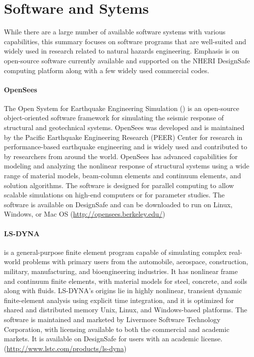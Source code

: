 \section{Software and Sytems}
\label{sec:resp_struct_tools}

While there are a large number of available software systems with various capabilities, this summary focuses on software programs that are well-suited and widely used in research related to natural hazards engineering. Emphasis is on open-source software currently available and supported on the NHERI DesignSafe computing platform along with a few widely used commercial codes.

\paragraph{OpenSees} The Open System for Earthquake Engineering Simulation () is an open-source object-oriented software framework for simulating the seismic response of structural and geotechnical systems. OpenSees was developed and is maintained by the Pacific Earthquake Engineering Research (PEER) Center for research in performance-based earthquake engineering and is widely used and contributed to by researchers from around the world. OpenSees has advanced capabilities for modeling and analyzing the nonlinear response of structural systems using a wide range of material models, beam-column elements and continuum elements, and solution algorithms. The software is designed for parallel computing to allow scalable simulations on high-end computers or for parameter studies. The software is available on DesignSafe and can be downloaded to run on Linux, Windows, or Mac OS (\url{http://opensees.berkeley.edu/})

\paragraph{LS-DYNA}  is a general-purpose finite element program capable of simulating complex real-world problems with primary users from the automobile, aerospace, construction, military, manufacturing, and bioengineering industries. It has nonlinear frame and continuum finite elements, with material models for steel, concrete, and soils along with fluids. LS-DYNA's origins lie in highly nonlinear, transient dynamic finite-element analysis using explicit time integration, and it is optimized for shared and distributed memory Unix, Linux, and Windows-based platforms. The software is maintained and marketed by Livermore Software Technology Corporation, with licensing available to both the commercial and academic markets. It is available on DesignSafe for users with an academic license. (\url{http://www.lstc.com/products/ls-dyna}) 

